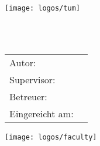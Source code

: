 \begin{titlepage}


	
  \centering

  \vspace{40mm}
  \texttt{[image: logos/tum]}

  \vspace{5mm}
  {\huge\MakeUppercase{\getFaculty{}}}\\

  \vspace{5mm}
  {\large\MakeUppercase{\getUniversity{}}}\\

  \vspace{20mm}
  {\large \getDoctype{}}

  \vspace{15mm}
  {\huge\bfseries \getTitle{}}

  \vspace{15mm}
  \begin{tabular}{l l}
    Autor: & \getAuthor{} \\
    Supervisor: & \getSupervisor{} \\
    Betreuer: & \getAdvisor{} \\
    Eingereicht am: & \getSubmissionDate{} \\
  \end{tabular}

  \vspace{15mm}
  \texttt{[image: logos/faculty]}
\end{titlepage}
